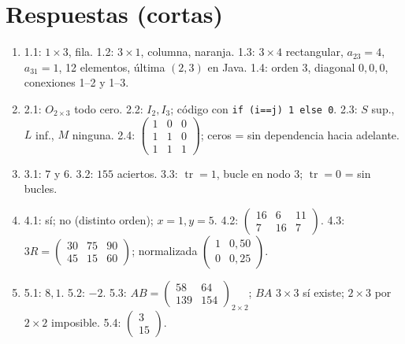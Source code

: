 \documentclass[a4paper,12pt]{article}
\theoremstyle{definition}
\begin{document}
\section*{Respuestas (cortas)}
\begin{enumerate}[label=\textbf{\arabic*.}, leftmargin=*]
\item[1.] 1.1: $1\times 3$, fila. 1.2: $3\times 1$, columna, naranja. 1.3: $3\times 4$ rectangular, $a_{23}=4$, $a_{31}=1$, 12 elementos, última $(2,3)$ en Java. 1.4: orden 3, diagonal $0,0,0$, conexiones 1--2 y 1--3.
\item[2.] 2.1: $O_{2\times 3}$ todo cero. 2.2: $I_2,I_3$; código con \texttt{if (i==j) 1 else 0}. 2.3: $S$ sup., $L$ inf., $M$ ninguna. 2.4: $\begin{pmatrix}1&0&0\\1&1&0\\1&1&1\end{pmatrix}$; ceros = sin dependencia hacia adelante.
\item[3.] 3.1: $7$ y $6$. 3.2: $155$ aciertos. 3.3: $\operatorname{tr}=1$, bucle en nodo 3; $\operatorname{tr}=0$ = sin bucles.
\item[4.] 4.1: sí; no (distinto orden); $x=1,y=5$. 4.2: $\begin{pmatrix}16&6&11\\7&16&7\end{pmatrix}$. 4.3: $3R=\begin{pmatrix}30&75&90\\45&15&60\end{pmatrix}$; normalizada $\begin{pmatrix}1&0{,}50\\0&0{,}25\end{pmatrix}$.
\item[5.] 5.1: $8{,}1$. 5.2: $-2$. 5.3: $AB=\begin{pmatrix}58&64\\139&154\end{pmatrix}_{2\times2}$; $BA$ $3\times3$ sí existe; $2\times3$ por $2\times2$ imposible. 5.4: $\begin{pmatrix}3\\15\end{pmatrix}$.

\end{enumerate}
\end{document}
